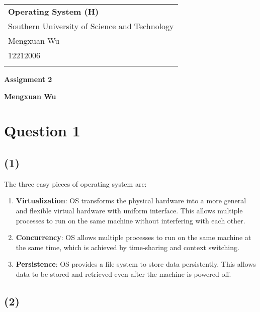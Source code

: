 \documentclass[a4paper,12pt]{article}
\begin{document}
\thispagestyle{empty} %

\begin{tabular}{p{15.5cm}}
{\large \bf Operating System (H)} \\
Southern University of Science and Technology \\ Mengxuan Wu \\ 12212006 \\
\hline
\\
\end{tabular}

\vspace*{0.3cm} %

\begin{center}
	{\Large \bf Assignment 2}
	\vspace{2mm}

	{\bf Mengxuan Wu}
		
\end{center}  

\vspace{0.4cm}

\section*{Question 1}

\subsection*{(1)}

The three easy pieces of operating system are:
\begin{enumerate}
    \item \textbf{Virtualization}: OS transforms the physical hardware into a more general and flexible virtual hardware with uniform interface. This allows multiple processes to run on the same machine without interfering with each other.
    \item \textbf{Concurrency}: OS allows multiple processes to run on the same machine at the same time, which is achieved by time-sharing and context switching.
	\item \textbf{Persistence}: OS provides a file system to store data persistently. This allows data to be stored and retrieved even after the machine is powered off.
\end{enumerate}

\subsection*{(2)}
\end{document}
